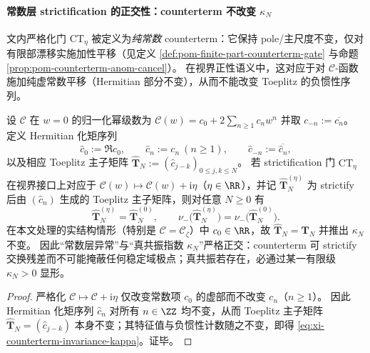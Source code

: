 \paragraph{常数层 strictification 的正交性：counterterm 不改变 \texorpdfstring{$\kappa_N$}{kappaN}}
文内严格化门 \(\mathrm{CT}_\eta\) 被定义为\emph{纯常数} counterterm：它保持 pole/主尺度不变，仅对有限部漂移实施加性平移（见定义 \ref{def:pom-finite-part-counterterm-gate} 与命题 \ref{prop:pom-counterterm-anom-cancel}）。
在视界正性语义中，这对应于对 \(\mathscr{C}\)-函数施加纯虚常数平移（Hermitian 部分不变），从而不能改变 Toeplitz 的负惯性序列。

\begin{theorem}\label{thm:xi-counterterm-invariance-kappa}
设 \(\mathscr{C}\) 在 \(w=0\) 的归一化幂级数为
\(
\mathscr{C}(w)=c_0+2\sum_{n\ge 1}c_n w^n
\)
并取 \(c_{-n}:=\overline{c_n}\)。
定义 Hermitian 化矩序列
\[
\widehat c_0:=\Re c_0,\qquad
\widehat c_n:=c_n\ (n\ge 1),\qquad
\widehat c_{-n}:=\overline{\widehat c_n},
\]
以及相应 Toeplitz 主子矩阵
\(
\widehat{\mathbf{T}}_N:=(\widehat c_{j-k})_{0\le j,k\le N}
\)。
若 strictification 门 \(\mathrm{CT}_\eta\) 在视界接口上对应于
\(\mathscr{C}(w)\mapsto \mathscr{C}(w)+\mathrm{i}\eta\)（\(\eta\in\RR\)），并记 \(\widehat{\mathbf{T}}_N^{(\eta)}\) 为 strictify 后由 \((\widehat c_n)\) 生成的 Toeplitz 主子矩阵，则对任意 \(N\ge 0\) 有
\begin{equation}\label{eq:xi-counterterm-invariance-kappa}
\boxed{\;
\widehat{\mathbf{T}}_N^{(\eta)}=\widehat{\mathbf{T}}_N^{(0)},
\qquad
\nu_-\!\bigl(\widehat{\mathbf{T}}_N^{(\eta)}\bigr)=\nu_-\!\bigl(\widehat{\mathbf{T}}_N^{(0)}\bigr).\;}
\end{equation}
在本文处理的实结构情形（特别是 \(\mathscr{C}=\mathscr{C}_{\zeta}\)）中 \(c_0\in\RR\)，故 \(\widehat{\mathbf{T}}_N=\mathbf{T}_N\) 并推出 \(\kappa_N\) 不变。
因此“常数层异常”与“真共振指数 \(\kappa_N\)”严格正交：counterterm 可 strictify 交换残差而不可能掩蔽任何稳定域极点；真共振若存在，必通过某一有限级 \(\kappa_N>0\) 显形。
\end{theorem}

\begin{proof}
严格化 \(\mathscr{C}\mapsto \mathscr{C}+\mathrm{i}\eta\) 仅改变常数项 \(c_0\) 的虚部而不改变 \(c_n\)（\(n\ge 1\)）。
因此 Hermitian 化矩序列 \(\widehat c_n\) 对所有 \(n\in\ZZ\) 均不变，从而 Toeplitz 主子矩阵
\(\widehat{\mathbf{T}}_N=(\widehat c_{j-k})\) 本身不变；其特征值与负惯性计数随之不变，即得 \eqref{eq:xi-counterterm-invariance-kappa}。证毕。
\end{proof}

